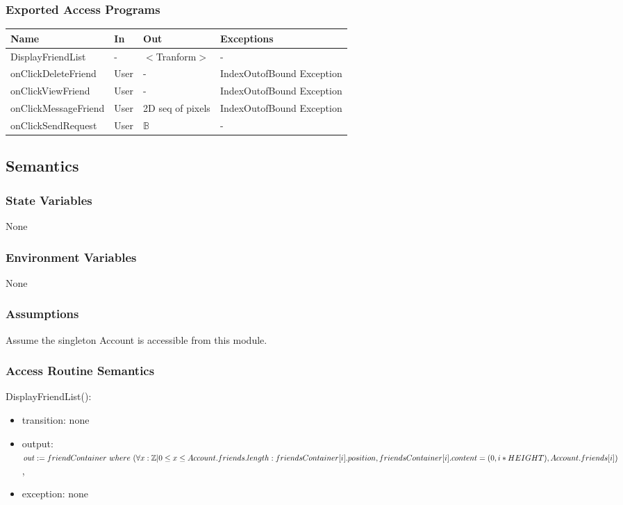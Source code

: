 \documentclass[12pt, titlepage]{article}
\begin{document}
\subsubsection{Exported Access Programs}
\begin{center}
\begin{tabular}{p{4cm} p{2cm} p{4cm} p{4cm}}
\hline
\textbf{Name} & \textbf{In} & \textbf{Out} & \textbf{Exceptions} \\
\hline
DisplayFriendList & - & $<$Tranform$>$ & - \\
onClickDeleteFriend & User & - & IndexOutofBound Exception\\
onClickViewFriend & User & - & IndexOutofBound Exception\\
onClickMessageFriend & User & 2D seq of pixels & IndexOutofBound Exception\\
onClickSendRequest & User & $\mathbb{B}$ & -\\
\hline
\end{tabular}
\end{center}

\subsection{Semantics}

\subsubsection{State Variables}

None

\subsubsection{Environment Variables}

None

\subsubsection{Assumptions}

Assume the singleton Account is accessible from this module.

\subsubsection{Access Routine Semantics}

\noindent DisplayFriendList():
\begin{itemize}
\item transition: none
\item output: $out := friendContainer\ where\ (\forall x : \mathbb{Z} | 0 \leq x \leq Account.friends.length:\\ friendsContainer[i].position, friendsContainer[i].content =\\ (0, i*HEIGHT), Account.friends[i])$,
\item exception: none
\end{itemize}
\end{document}
